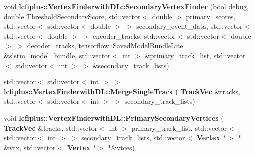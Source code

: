 \begin{DoxyCompactItemize}
\item 
void \textbf{ lcfiplus\+::\+Vertex\+Finderwith\+D\+L\+::\+Secondary\+Vertex\+Finder} (bool debug, double Threshold\+Secondary\+Score, std\+::vector$<$ double $>$ primary\+\_\+scores, std\+::vector$<$ std\+::vector$<$ double $>$ $>$ secondary\+\_\+event\+\_\+data, std\+::vector$<$ std\+::vector$<$ double $>$ $>$ encoder\+\_\+tracks, std\+::vector$<$ std\+::vector$<$ double $>$ $>$ decoder\+\_\+tracks, tensorflow\+::\+Saved\+Model\+Bundle\+Lite \&slstm\+\_\+model\+\_\+bundle, std\+::vector$<$ int $>$ \&primary\+\_\+track\+\_\+list, std\+::vector$<$ std\+::vector$<$ int $>$ $>$ \&secondary\+\_\+track\+\_\+lists)
\item 
std\+::vector$<$ std\+::vector$<$ int $>$ $>$ \textbf{ lcfiplus\+::\+Vertex\+Finderwith\+D\+L\+::\+Merge\+Single\+Track} (\textbf{ Track\+Vec} \&tracks, std\+::vector$<$ std\+::vector$<$ int $>$ $>$ secondary\+\_\+track\+\_\+lists)
\item 
void \textbf{ lcfiplus\+::\+Vertex\+Finderwith\+D\+L\+::\+Primary\+Secondary\+Vertices} (\textbf{ Track\+Vec} \&tracks, std\+::vector$<$ int $>$ primary\+\_\+track\+\_\+list, std\+::vector$<$ std\+::vector$<$ int $>$ $>$ secondary\+\_\+track\+\_\+lists, std\+::vector$<$ \textbf{ Vertex} $\ast$$>$ $\ast$\&vtx, std\+::vector$<$ \textbf{ Vertex} $\ast$$>$ $\ast$\&vtces)
\end{DoxyCompactItemize}
